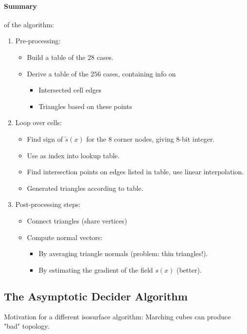 \paragraph{Summary} of the algorithm:
\begin{enumerate}
    \item Pre-processing:
        \begin{itemize}
            \item Build a table of the $28$ cases.
            \item Derive a table of the $256$ cases, containing info on
            \begin{itemize}
                \item Intersected cell edges
                \item Triangles based on these points
            \end{itemize}
        \end{itemize}
    \item Loop over cells:
        \begin{itemize}
            \item Find sign of $\tilde s(x)$ for the $8$ corner nodes, giving $8$-bit integer.
            \item Use as index into lookup table.
            \item Find intersection points on edges listed in table, use linear interpolation.
            \item Generated triangles according to table.
        \end{itemize}
    \item Post-processing steps:
        \begin{itemize}
            \item Connect triangles (share vertices)
            \item Compute normal vectors:
                \begin{itemize}
                    \item By averaging triangle normals (problem: thin triangles!).
                    \item By estimating the gradient of the field $s(x)$ (better).
                \end{itemize}
        \end{itemize}
\end{enumerate}

\subsection{The Asymptotic Decider Algorithm}
Motivation for a different isosurface algorithm: Marching cubes can produce "bad" topology.

